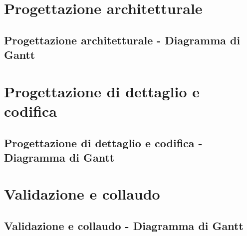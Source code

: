 \documentclass[PianoDiProgetto.tex]{subfiles}
\begin{document}
\section{Progettazione architetturale}
\subsection{Progettazione architetturale - Diagramma di Gantt}

\section{Progettazione di dettaglio e codifica}
\subsection{Progettazione di dettaglio e codifica - Diagramma di Gantt}

\section{Validazione e collaudo}
\subsection{Validazione e collaudo - Diagramma di Gantt}
\end{document}
